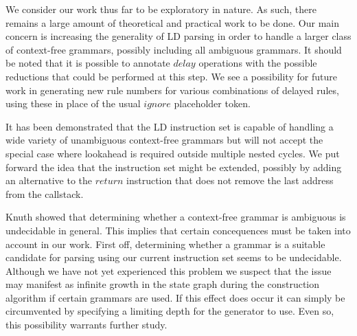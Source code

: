 \documentclass[envcountsame,runningheads]{llncs}
\begin{document}
We consider our work thus far to be exploratory in nature.
As such, there remains a large amount of theoretical and practical work to be done.
Our main concern is increasing the generality of LD parsing in order to handle a larger class of context-free grammars, possibly including all ambiguous grammars. 
It should be noted that it is possible to annotate $delay$ operations with the possible reductions that could be performed at this step.
We see a possibility for future work in generating new rule numbers for various combinations of delayed rules, using these in place of the usual $ignore$ placeholder token.


It has been demonstrated that the LD instruction set is capable of handling a wide variety of unambiguous context-free grammars but will not accept the special case where lookahead is required outside multiple nested cycles.
We put forward the idea that the instruction set might be extended, possibly by adding an alternative to the $return$ instruction that does not remove the last address from the callstack.

Knuth showed that determining whether a context-free grammar is ambiguous is undecidable in general\cite{knuth65}. 
This implies that certain concequences must be taken into account in our work. 
First off, determining whether a grammar is a suitable candidate for parsing using our current instruction set seems to be undecidable.
Although we have not yet experienced this problem we suspect that the issue may manifest as infinite growth in the state graph during the construction algorithm if certain grammars are used.
If this effect does occur it can simply be circumvented by specifying a limiting depth for the generator to use. 
Even so, this possibility warrants further study.
\end{document}
